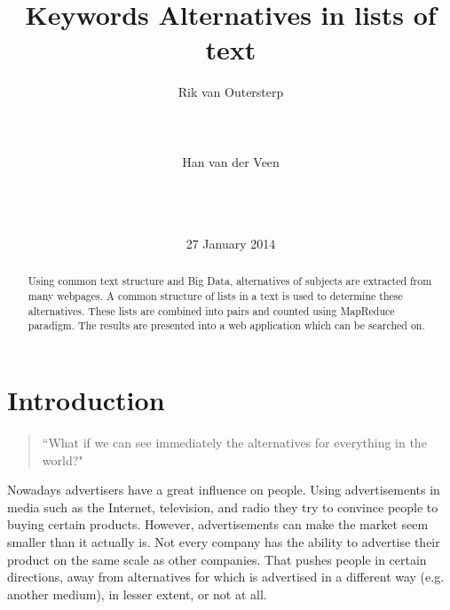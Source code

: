 \documentclass{sig-alternate}
\begin{document}
\title{Keywords Alternatives in lists of text}
\author{
\alignauthor
Rik van Outersterp\\
       \\
       \\
       \\
\alignauthor
Han van der Veen\\
        \\
       \\
       \\
}
\date{27 January 2014}

\maketitle

\begin{abstract}
Using common text structure and Big Data, alternatives of subjects are extracted from many webpages. A common structure of lists in a text is used to determine these alternatives. These lists are combined into pairs and counted using MapReduce paradigm. The results are presented into a web application which can be searched on.
\end{abstract}



\section{Introduction}

\begin{quote}
``What if we can see immediately the alternatives for everything in the world?"
\end{quote}

Nowadays advertisers have a great influence on people. Using advertisements in media such as the Internet, television, and radio they try to convince people to buying certain products. However, advertisements can make the market seem smaller than it actually is. Not every company has the ability to advertise their product on the same scale as other companies.
That pushes people in certain directions, away from alternatives for which is advertised in a different way (e.g. another medium), in lesser extent, or not at all.
\end{document}
